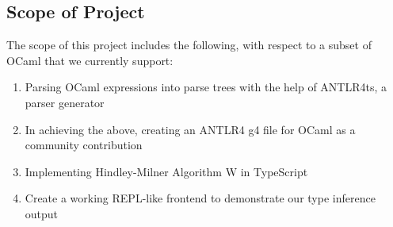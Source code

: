 \subsection{Scope of Project}
The scope of this project includes the following, with respect to a subset of OCaml that we currently support:
\begin{enumerate}
    \item Parsing OCaml expressions into parse trees with the help of ANTLR4ts, a parser generator
    \item In achieving the above, creating an ANTLR4 g4 file for OCaml as a community contribution
    \item Implementing Hindley-Milner Algorithm W in TypeScript
    \item Create a working REPL-like frontend to demonstrate our type inference output
  \end{enumerate}

